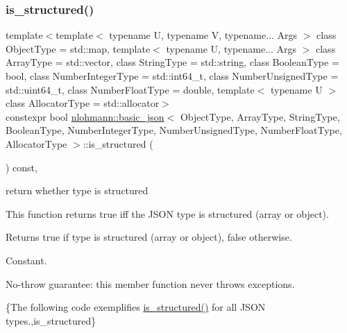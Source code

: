 \subsubsection{\texorpdfstring{is\+\_\+structured()}{is\_structured()}}
{\footnotesize\ttfamily template$<$template$<$ typename U, typename V, typename... Args $>$ class Object\+Type = std\+::map, template$<$ typename U, typename... Args $>$ class Array\+Type = std\+::vector, class String\+Type  = std\+::string, class Boolean\+Type  = bool, class Number\+Integer\+Type  = std\+::int64\+\_\+t, class Number\+Unsigned\+Type  = std\+::uint64\+\_\+t, class Number\+Float\+Type  = double, template$<$ typename U $>$ class Allocator\+Type = std\+::allocator$>$ \\
constexpr bool \hyperlink{classnlohmann_1_1basic__json}{nlohmann\+::basic\+\_\+json}$<$ Object\+Type, Array\+Type, String\+Type, Boolean\+Type, Number\+Integer\+Type, Number\+Unsigned\+Type, Number\+Float\+Type, Allocator\+Type $>$\+::is\+\_\+structured (\begin{DoxyParamCaption}{ }\end{DoxyParamCaption}) const\hspace{0.3cm}{\ttfamily [inline]}, {\ttfamily [noexcept]}}



return whether type is structured 

This function returns true iff the J\+S\+ON type is structured (array or object).

\begin{DoxyReturn}{Returns}
{\ttfamily true} if type is structured (array or object), {\ttfamily false} otherwise.
\end{DoxyReturn}
Constant.

No-\/throw guarantee\+: this member function never throws exceptions.

\{The following code exemplifies {\ttfamily \hyperlink{classnlohmann_1_1basic__json_a873f4bff2f2a83f68fc1b5341ebdd446}{is\+\_\+structured()}} for all J\+S\+ON types.,is\+\_\+structured\}

